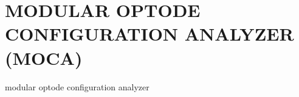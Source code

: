 
\chapter{MODULAR OPTODE CONFIGURATION ANALYZER (MOCA)} %
modular optode configuration analyzer
\label{chap:moca}
